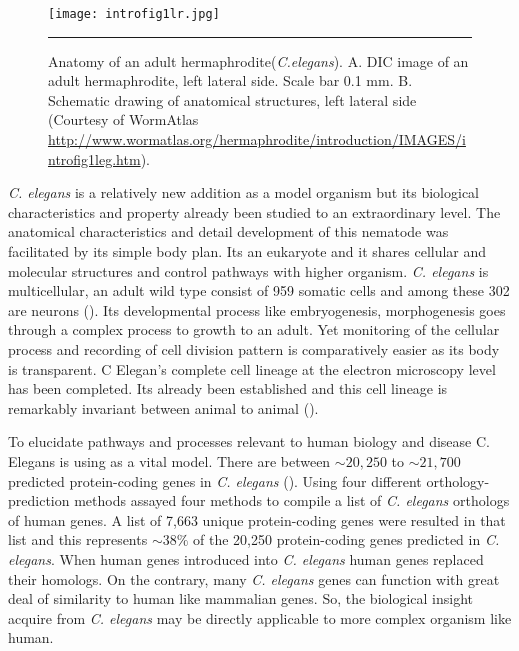 \begin{figure}%
	\centering
		\texttt{[image: introfig1lr.jpg]}
		\rule{35em}{0.5pt}
	\caption[Anatomy of an adult \textit{C.elegans}]{Anatomy of an adult hermaphrodite(\textit{C.elegans}). 
	A. DIC image of an adult hermaphrodite, left lateral side. Scale bar 0.1 mm. 
	B. Schematic drawing of anatomical structures, left lateral side 
	(Courtesy of WormAtlas \url{http://www.wormatlas.org/hermaphrodite/introduction/IMAGES/introfig1leg.htm}).}
	\label{fig:anatomy}
\end{figure}

\textit{C. elegans} is a relatively new addition as a model organism but its biological characteristics 
and property already been studied to an extraordinary level. The anatomical characteristics and 
detail development of this nematode was facilitated by its simple body plan. Its an eukaryote and
it shares cellular and molecular structures and control pathways with higher organism. \textit{C. elegans}
is multicellular, an adult wild type  consist of 959 somatic cells and among these 302 are neurons
(\cite{Sulston:1977, Palikaras:2013}). Its developmental process like embryogenesis, morphogenesis 
goes through a complex process to growth to an adult. Yet monitoring of the cellular process 
and recording of cell division pattern is comparatively easier as its body is transparent. 
C Elegan's complete cell lineage at the electron microscopy level has been completed. 
Its already been established and this cell lineage is remarkably invariant between animal to
animal (\cite{Brenner:1974, Byerly:1976, Sulston:1980, Wood:1988}).


To elucidate pathways and processes relevant to human biology 
and disease C. Elegans is using as a vital model. There are between $\sim20,250$ to $\sim21,700$ 
predicted protein-coding genes in \textit{C. elegans} (\cite{Gerstein:2010}).
Using four different orthology-prediction methods \cite{Daniel:2011} assayed four methods 
to compile a list of \textit{C. elegans} orthologs of human genes. 
A  list of 7,663 unique protein-coding genes were resulted in that list and this
represents $\sim38\%$ of the 20,250 protein-coding genes predicted in \textit{C. elegans}. When human genes 
introduced into \textit{C. elegans} human genes replaced their homologs. On the contrary, many \textit{C. elegans}
genes can function with great deal of similarity to human like mammalian genes. So, 
the biological insight acquire from \textit{C. elegans} may be directly applicable to more 
complex organism like human.


